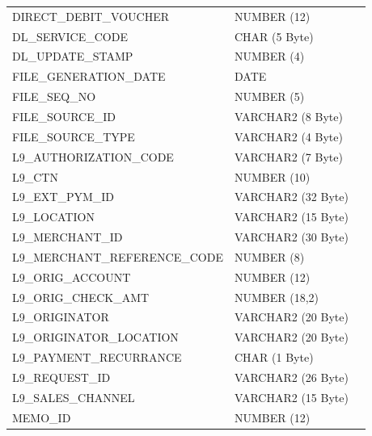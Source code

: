 \documentclass[12pt,twoside]{article}
\begin{document}
\begin{longtable}{lll}
 DIRECT\_DEBIT\_VOUCHER         &  NUMBER (12)          &                        \\
 DL\_SERVICE\_CODE              &  CHAR (5 Byte)        &                        \\
 DL\_UPDATE\_STAMP              &  NUMBER (4)           &                        \\
 FILE\_GENERATION\_DATE         &  DATE                 &                        \\
 FILE\_SEQ\_NO                  &  NUMBER (5)           &                        \\
 FILE\_SOURCE\_ID               &  VARCHAR2 (8 Byte)    &                        \\
 FILE\_SOURCE\_TYPE             &  VARCHAR2 (4 Byte)    &                        \\
 L9\_AUTHORIZATION\_CODE        &  VARCHAR2 (7 Byte)    &                        \\
 L9\_CTN                        &  NUMBER (10)          &                        \\
 L9\_EXT\_PYM\_ID               &  VARCHAR2 (32 Byte)   &                        \\
 L9\_LOCATION                   &  VARCHAR2 (15 Byte)   &                        \\
 L9\_MERCHANT\_ID               &  VARCHAR2 (30 Byte)   &                        \\
 L9\_MERCHANT\_REFERENCE\_CODE  &  NUMBER (8)           &                        \\
 L9\_ORIG\_ACCOUNT              &  NUMBER (12)          &                        \\
 L9\_ORIG\_CHECK\_AMT           &  NUMBER (18,2)        &                        \\
 L9\_ORIGINATOR                 &  VARCHAR2 (20 Byte)   &                        \\
 L9\_ORIGINATOR\_LOCATION       &  VARCHAR2 (20 Byte)   &                        \\
 L9\_PAYMENT\_RECURRANCE        &  CHAR (1 Byte)        &                        \\
 L9\_REQUEST\_ID                &  VARCHAR2 (26 Byte)   &                        \\
 L9\_SALES\_CHANNEL             &  VARCHAR2 (15 Byte)   &                        \\
 MEMO\_ID                       &  NUMBER (12)          &                        \\

\end{longtable}
\end{document}
